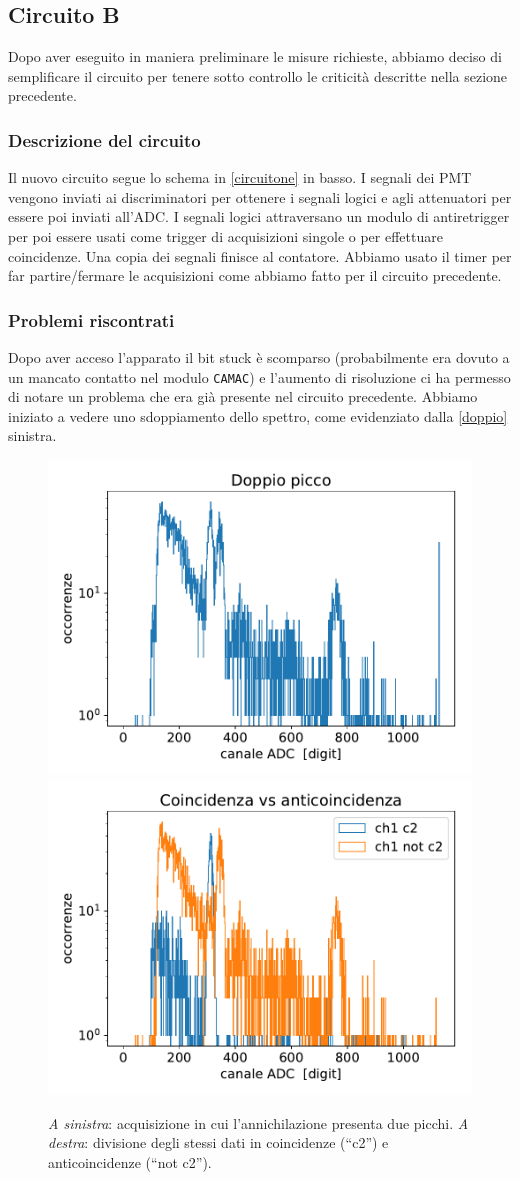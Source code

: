 \subsection{Circuito B}

Dopo aver eseguito in maniera preliminare le misure richieste, abbiamo deciso di semplificare il circuito per tenere sotto controllo le criticità descritte nella sezione precedente.

\subsubsection{Descrizione del circuito}

Il nuovo circuito segue lo schema in \autoref{circuitone} in basso.
I segnali dei PMT vengono inviati ai discriminatori per ottenere i segnali logici e agli attenuatori per essere poi inviati all'ADC. I segnali logici attraversano un modulo di antiretrigger per poi essere usati come trigger di acquisizioni singole o per effettuare coincidenze. Una copia dei segnali finisce al contatore. Abbiamo usato il timer per far partire/fermare le acquisizioni come abbiamo fatto per il circuito precedente.

\subsubsection{Problemi riscontrati}
\label{ref}
Dopo aver acceso l'apparato il bit stuck è scomparso
(probabilmente era dovuto a un mancato contatto nel modulo \texttt{CAMAC})
e l'aumento di risoluzione ci ha permesso di notare un problema che era già presente nel circuito precedente.
Abbiamo iniziato a vedere uno sdoppiamento dello spettro, come evidenziato dalla \autoref{doppio} sinistra. 

\begin{figure}
\centering
\subfloat
{
\includegraphics[width=18 em]{immagini/doppio}
}
\subfloat
{
\includegraphics[width=18 em]{immagini/sdoppio}
}
\caption{\emph{A sinistra}: acquisizione in cui l'annichilazione presenta due picchi.
\emph{A destra}: divisione degli stessi dati in coincidenze (``c2'') e anticoincidenze (``not c2'').}
\label{doppio}
\end{figure}


